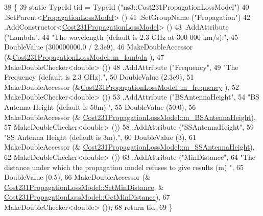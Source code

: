 \begin{DoxyCode}
38 \{
39   \textcolor{keyword}{static} TypeId tid = TypeId (\textcolor{stringliteral}{"ns3::Cost231PropagationLossModel"})
40     .SetParent<\hyperlink{classns3_1_1PropagationLossModel_ace8b78c2c8e805cd0a919d7e3543318c}{PropagationLossModel}> ()
41     .SetGroupName (\textcolor{stringliteral}{"Propagation"})
42     .AddConstructor<\hyperlink{classns3_1_1Cost231PropagationLossModel_a66a71d3fdabd10ff7a90a5447e656f47}{Cost231PropagationLossModel}> ()
43     .AddAttribute (\textcolor{stringliteral}{"Lambda"},
44                    \textcolor{stringliteral}{"The wavelength  (default is 2.3 GHz at 300 000 km/s)."},
45                    DoubleValue (300000000.0 / 2.3e9),
46                    MakeDoubleAccessor (&\hyperlink{classns3_1_1Cost231PropagationLossModel_a24ca1169081f00f44d025f6a10bf6db0}{Cost231PropagationLossModel::m\_lambda}
      ),
47                    MakeDoubleChecker<double> ())
48     .AddAttribute (\textcolor{stringliteral}{"Frequency"},
49                    \textcolor{stringliteral}{"The Frequency  (default is 2.3 GHz)."},
50                    DoubleValue (2.3e9),
51                    MakeDoubleAccessor (&\hyperlink{classns3_1_1Cost231PropagationLossModel_a397d2259ee4c845b903d6abed7b26683}{Cost231PropagationLossModel::m\_frequency}
      ),
52                    MakeDoubleChecker<double> ())
53     .AddAttribute (\textcolor{stringliteral}{"BSAntennaHeight"},
54                    \textcolor{stringliteral}{"BS Antenna Height (default is 50m)."},
55                    DoubleValue (50.0),
56                    MakeDoubleAccessor (&
      \hyperlink{classns3_1_1Cost231PropagationLossModel_ad564778df097fefd5c461ebc814f9d22}{Cost231PropagationLossModel::m\_BSAntennaHeight}),
57                    MakeDoubleChecker<double> ())
58     .AddAttribute (\textcolor{stringliteral}{"SSAntennaHeight"},
59                    \textcolor{stringliteral}{"SS Antenna Height (default is 3m)."},
60                    DoubleValue (3),
61                    MakeDoubleAccessor (&
      \hyperlink{classns3_1_1Cost231PropagationLossModel_a143ebc7328775a1c8b5c48ec12692dc1}{Cost231PropagationLossModel::m\_SSAntennaHeight}),
62                    MakeDoubleChecker<double> ())
63     .AddAttribute (\textcolor{stringliteral}{"MinDistance"},
64                    \textcolor{stringliteral}{"The distance under which the propagation model refuses to give results (m) "},
65                    DoubleValue (0.5),
66                    MakeDoubleAccessor (&
      \hyperlink{classns3_1_1Cost231PropagationLossModel_acd8ac9e94cfbf66e336d4c5930388c42}{Cost231PropagationLossModel::SetMinDistance}, &
      \hyperlink{classns3_1_1Cost231PropagationLossModel_a4780acde1aebc6321f97648c067551e9}{Cost231PropagationLossModel::GetMinDistance}),
67                    MakeDoubleChecker<double> ());
68   \textcolor{keywordflow}{return} tid;
69 \}
\end{DoxyCode}


